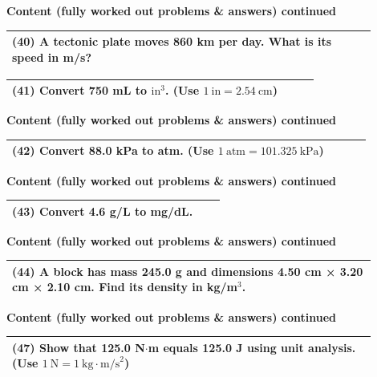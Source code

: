 \documentclass{article}
\begin{document}
\newpage
\noindent
{\large \textbf{Content (fully worked out problems \& answers) continued}} \\[0.2em]
\begin{tabular}{|p{0.9\linewidth}|}
\hline
\vspace{0.2cm}

\textbf{(40)} A tectonic plate moves 860 km per day. What is its speed in m/s? \\
\hline
\end{tabular}
\newpage
\begin{tabular}{|p{0.9\linewidth}|}
\hline
\vspace{0.2cm}

\textbf{(41)} Convert 750 mL to $\text{in}^3$. (Use $1~\text{in}=2.54~\text{cm}$) \\
\hline
\end{tabular}
\newpage
\noindent
{\large \textbf{Content (fully worked out problems \& answers) continued}} \\[0.2em]
\begin{tabular}{|p{0.9\linewidth}|}
\hline
\vspace{0.2cm}

\textbf{(42)} Convert 88.0 kPa to atm. (Use $1~\text{atm}=101.325~\text{kPa}$) \\
\hline
\end{tabular}
\newpage
{\large \textbf{Content (fully worked out problems \& answers) continued}} \\[0.2em]
\begin{tabular}{|p{0.9\linewidth}|}
\hline
\vspace{0.2cm}

\textbf{(43)} Convert 4.6 g/L to mg/dL. \\
\hline

\end{tabular}
\newpage
\noindent
{\large \textbf{Content (fully worked out problems \& answers) continued}} \\[0.2em]
\begin{tabular}{|p{0.9\linewidth}|}
\hline
\vspace{0.2cm}

\textbf{(44)} A block has mass 245.0 g and dimensions 4.50 cm × 3.20 cm × 2.10 cm. Find its density in kg/m$^3$. \\
\hline
\end{tabular}
\newpage
\noindent
{\large \textbf{Content (fully worked out problems \& answers) continued}} \\[0.2em]
\begin{tabular}{|p{0.9\linewidth}|}
\hline
\vspace{0.2cm}

\textbf{(47)} Show that 125.0 N$\cdot$m equals 125.0 J using unit analysis. (Use $1~\text{N}=1~\text{kg}\cdot\text{m/s}^2$) \\
\hline
\end{tabular}
\end{document}
